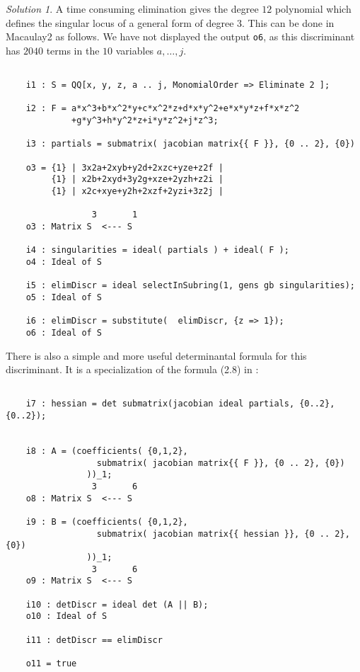 \documentclass[12pt,noamsfonts]{amsart}
\theoremstyle{definition}
\theoremstyle{remark}
\newtheorem*{solution}{Solution}
\begin{document}
\begin{solution}
A time consuming elimination gives the degree $12$ polynomial which
defines the singular locus of a general form of degree $3$.  This can
be done in {\sc Macaulay2} as follows.  We have not displayed the
output {\tt o6}, as this discriminant  has $2040$ terms in the $10$
variables $a, \ldots, j$.

{\scriptsize
\begin{verbatim}

    i1 : S = QQ[x, y, z, a .. j, MonomialOrder => Eliminate 2 ];
    
    i2 : F = a*x^3+b*x^2*y+c*x^2*z+d*x*y^2+e*x*y*z+f*x*z^2
             +g*y^3+h*y^2*z+i*y*z^2+j*z^3;
    
    i3 : partials = submatrix( jacobian matrix{{ F }}, {0 .. 2}, {0})
    
    o3 = {1} | 3x2a+2xyb+y2d+2xzc+yze+z2f |
         {1} | x2b+2xyd+3y2g+xze+2yzh+z2i |
         {1} | x2c+xye+y2h+2xzf+2yzi+3z2j |
    
                 3       1
    o3 : Matrix S  <--- S
    
    i4 : singularities = ideal( partials ) + ideal( F );
    o4 : Ideal of S
    
    i5 : elimDiscr = ideal selectInSubring(1, gens gb singularities);
    o5 : Ideal of S
    
    i6 : elimDiscr = substitute(  elimDiscr, {z => 1});
    o6 : Ideal of S

\end{verbatim}}
\noindent There is also a simple and more useful determinantal formula
for this discriminant. It is a specialization of the formula (2.8) in 
 \cite[\S 3.2]{CLO2}:
{\scriptsize
\begin{verbatim}

    i7 : hessian = det submatrix(jacobian ideal partials, {0..2}, {0..2});
                                   
    
    i8 : A = (coefficients( {0,1,2},
                  submatrix( jacobian matrix{{ F }}, {0 .. 2}, {0})
                ))_1;               
                 3       6
    o8 : Matrix S  <--- S
    
    i9 : B = (coefficients( {0,1,2},
                  submatrix( jacobian matrix{{ hessian }}, {0 .. 2}, {0})
                ))_1;                 
                 3       6
    o9 : Matrix S  <--- S
    
    i10 : detDiscr = ideal det (A || B);
    o10 : Ideal of S
    
    i11 : detDiscr == elimDiscr
    
    o11 = true

\end{verbatim}}
\end{solution}
\end{document}
